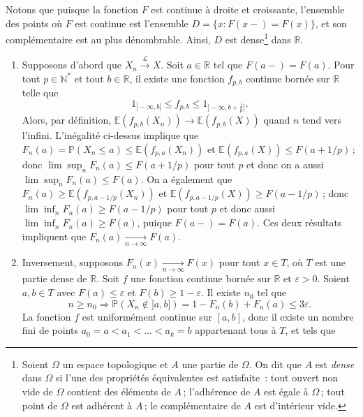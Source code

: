 Notons que puisque la fonction \(F\) est continue à droite et
croissante, l'ensemble des points où \(F\) est continue est l'ensemble
\(D = \{x : F (x-) = F (x)\}\), et son complémentaire est au plus
dénombrable. Ainsi, \(D\) est dense\footnote{Soient \(\Omega\) un espace
  topologique et \(A\) une partie de \(\Omega\). On dit que \(A\) est
  \emph{dense} dans \(\Omega\) si l'une des propriétés équivalentes est
  satisfaite~: tout ouvert non vide de \(\Omega\) contient des éléments
  de \(A\)\,; l'adhérence de \(A\) est égale à \(\Omega\)\,; tout point
  de \(\Omega\) est adhérent à \(A\)\,; le complémentaire de \(A\) est
  d'intérieur vide.} dans \(\mathbb{R}\).

\begin{preuve}
\begin{enumerate}
\def\labelenumi{\arabic{enumi}.}
\tightlist
\item
  Supposons d'abord que \(X_n \xrightarrow{\mathcal{L}} X\). Soit
  \(a \in \mathbb{R}\) tel que \(F(a-)=F(a)\). Pour tout
  \(p \in \mathbb{N}^\ast\) et tout \(b \in \mathbb{R}\), il existe une
  fonction \(f_{p,b}\) continue bornée sur \(\mathbb{R}\) telle que
  \[ 1_{]-\infty,b]} \leq f_{p,b} \leq 1_{]-\infty,b + \frac{1}{p}]}.\]
  Alors, par définition,
  \(\mathbb{E}(f_{p,b}(X_n)) \to \mathbb{E}(f_{p,b}(X))\) quand \(n\)
  tend vers l'infini. L'inégalité ci-dessus implique que
  \(F_n(a) = \mathbb{P}(X_n \leq a) \leq \mathbb{E}(f_{p,a}(X_n))\) et
  \(\mathbb{E}(f_{p,a}(X)) \leq F(a+1/p)\)\,; donc
  \(\lim\sup_n F_n(a) \leq F(a+1/p)\) pour tout \(p\) et donc on a aussi
  \(\lim\sup_n F_n(a) \leq F(a)\). On a également que
  \(F_n(a) \geq \mathbb{E}(f_{p,a-1/p}(X_n))\) et
  \(\mathbb{E}(f_{p,a-1/p}(X)) \geq F(a-1/p)\)\,; donc
  \(\lim\inf_n F_n(a) \geq F(a-1/p)\) pour tout \(p\) et donc aussi
  \(\lim\inf_n F_n(a) \geq F(a)\), puique \(F(a-)=F(a)\). Ces deux
  résultats impliquent que \(F_n(a) \xrightarrow[n\to \infty]{} F(a)\).
\item
  Inversement, supposons \(F_n(x) \xrightarrow[n\to \infty]{} F(x)\)
  pour tout \(x\in T\), où \(T\) est une partie dense de \(\mathbb{R}\).
  Soit \(f\) une fonction continue bornée sur \(\mathbb{R}\) et
  \(\varepsilon > 0\). Soient \(a,b \in T\) avec
  \(F(a) \leq \varepsilon\) et \(F(b) \geq 1-\varepsilon\). Il existe
  \(n_0\) tel que
  \[ n\geq n_0 \Rightarrow \mathbb{P}(X_n\notin ]a,b]) = 1-F_n(b)+F_n(a) \leq 3\varepsilon.\]
  La fonction \(f\) est uniformément continue sur \([a,b]\), donc il
  existe un nombre fini de points \(a_0 = a < a_1 < \ldots < a_k = b\)
  appartenant tous à \(T\), et tels que

\end{enumerate}
\end{preuve}
